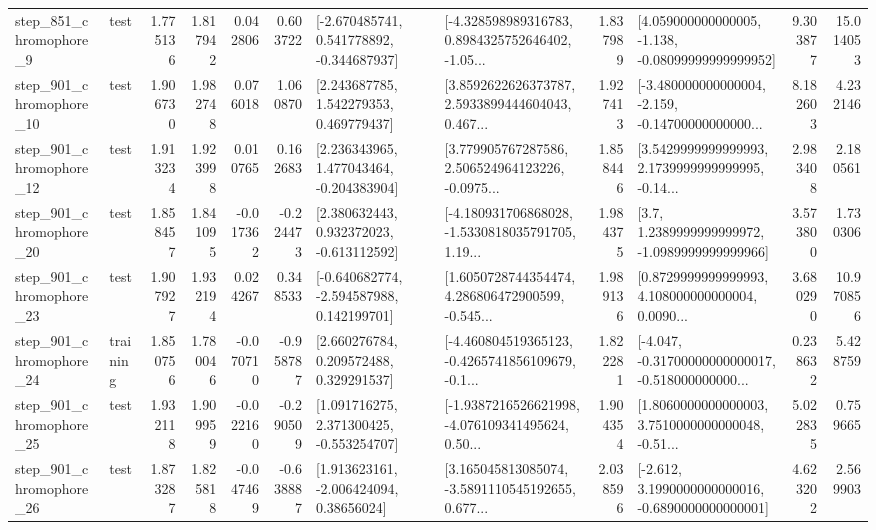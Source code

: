 \begin{tabular}{llrrrrllrlrr}
   step\_851\_chromophore\_9 &      test &      1.775136 &    1.817942 &      0.042806 &  0.603722 &   [-2.670485741, 0.541778892, -0.344687937] &  [-4.328598989316783, 0.8984325752646402, -1.05... &       1.837989 &  [4.059000000000005, -1.138, -0.08099999999999952] &            9.303877 &         15.014053 \\
  step\_901\_chromophore\_10 &      test &      1.906730 &    1.982748 &      0.076018 &  1.060870 &     [2.243687785, 1.542279353, 0.469779437] &  [3.8592622626373787, 2.5933899444604043, 0.467... &       1.927413 &  [-3.480000000000004, -2.159, -0.14700000000000... &            8.182603 &          4.232146 \\
  step\_901\_chromophore\_12 &      test &      1.913234 &    1.923998 &      0.010765 &  0.162683 &    [2.236343965, 1.477043464, -0.204383904] &  [3.779905767287586, 2.506524964123226, -0.0975... &       1.858446 &  [3.5429999999999993, 2.1739999999999995, -0.14... &            2.983408 &          2.180561 \\
  step\_901\_chromophore\_20 &      test &      1.858457 &    1.841095 &     -0.017362 & -0.224473 &    [2.380632443, 0.932372023, -0.613112592] &  [-4.180931706868028, -1.5330818035791705, 1.19... &       1.984375 &     [3.7, 1.2389999999999972, -1.0989999999999966] &            3.573800 &          1.730306 \\
  step\_901\_chromophore\_23 &      test &      1.907927 &    1.932194 &      0.024267 &  0.348533 &   [-0.640682774, -2.594587988, 0.142199701] &  [1.6050728744354474, 4.286806472900599, -0.545... &       1.989136 &  [0.8729999999999993, 4.108000000000004, 0.0090... &            3.680290 &         10.970856 \\
  step\_901\_chromophore\_24 &  training &      1.850756 &    1.780046 &     -0.070710 & -0.958787 &     [2.660276784, 0.209572488, 0.329291537] &  [-4.460804519365123, -0.4265741856109679, -0.1... &       1.822281 &  [-4.047, -0.31700000000000017, -0.518000000000... &            0.238632 &          5.428759 \\
  step\_901\_chromophore\_25 &      test &      1.932118 &    1.909959 &     -0.022160 & -0.290509 &    [1.091716275, 2.371300425, -0.553254707] &  [-1.9387216526621998, -4.076109341495624, 0.50... &       1.904354 &  [1.8060000000000003, 3.7510000000000048, -0.51... &            5.022835 &          0.759665 \\
  step\_901\_chromophore\_26 &      test &      1.873287 &    1.825818 &     -0.047469 & -0.638887 &     [1.913623161, -2.006424094, 0.38656024] &  [3.165045813085074, -3.5891110545192655, 0.677... &       2.038596 &  [-2.612, 3.1990000000000016, -0.6890000000000001] &            4.623202 &          2.569903 \\

\end{tabular}
